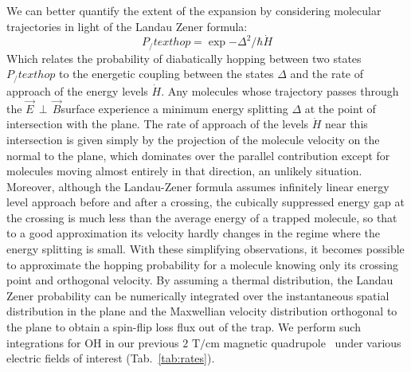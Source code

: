 \documentclass[%
 reprint,
 amsmath,amssymb,
 aps,
prl,
]{revtex4-1}
\newcommand{\epb}{{$\vec{E}\,{\perp}\,\vec{B}$}}
\begin{document}
We can better quantify the extent of the expansion by considering molecular trajectories in light of the Landau Zener formula:
\begin{equation}
P_/text{hop}=\exp{-\Delta^2/\hbar\dot{H}}
\end{equation}
Which relates the probability of diabatically hopping between two states $P_/text{hop}$ to the energetic coupling between the states $\Delta$ and the rate of approach of the energy levels $\dot{H}$. 
Any molecules whose trajectory passes through the \epb surface experience a minimum energy splitting $\Delta$ at the point of intersection with the plane.
The rate of approach of the levels $\dot{H}$ near this intersection is given simply by the projection of the molecule velocity on the normal to the plane, which dominates over the parallel contribution except for molecules moving almost entirely in that direction, an unlikely situation.
Moreover, although the Landau-Zener formula assumes infinitely linear energy level approach before and after a crossing, the cubically suppressed energy gap at the crossing is much less than the average energy of a trapped molecule, so that to a good approximation its velocity hardly changes in the regime where the energy splitting is small.
With these simplifying observations, it becomes possible to approximate the hopping probability for a molecule knowing only its crossing point and orthogonal velocity.
By assuming a thermal distribution, the Landau Zener probability can be numerically integrated over the instantaneous spatial distribution in the plane and the Maxwellian velocity distribution orthogonal to the plane to obtain a spin-flip loss flux out of the trap.
We perform such integrations for OH in our previous $2\text{ T/cm}$ magnetic quadrupole~\cite{Sawyer2008} under various electric fields of interest (Tab.~\ref{tab:rates}).

\end{document}
